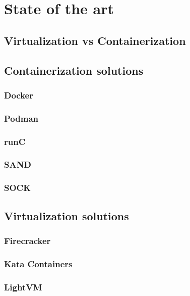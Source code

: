 \chapter{State of the art}

\section{Virtualization vs Containerization}

\section{Containerization solutions}
\subsection{Docker}
\subsection{Podman}
\subsection{runC}
\subsection{SAND}
\subsection{SOCK}

\section{Virtualization solutions}
\subsection{Firecracker}
\subsection{Kata Containers}
\subsection{LightVM}
